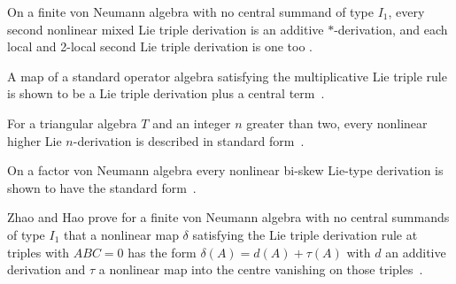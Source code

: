 On a finite von Neumann algebra with no central summand of type $I_1$, every second nonlinear mixed Lie triple derivation is an additive $*$-derivation, and each local and 2-local second Lie triple derivation is one too \cite[Abstract]{SecondNonlinearMixedLieTriple2020}.

A map of a standard operator algebra satisfying the multiplicative Lie triple rule is shown to be a Lie triple derivation plus a central term~\cite{WlMultiplicativeLieTriple2018}.

For a triangular algebra $T$ and an integer $n$ greater than two, every nonlinear higher Lie $n$-derivation is described in standard form~\cite{WlTriangularAlgebrasWithNonlinea2021}.

On a factor von Neumann algebra every nonlinear bi-skew Lie-type derivation is shown to have the standard form~\cite{WlNonlinearBiSkewLieTypeDerivati2020}.

Zhao and Hao prove for a finite von Neumann algebra with no central summands of type $I_1$ that a nonlinear map $\delta$ satisfying the Lie triple derivation rule at triples with $ABC=0$ has the form $\delta(A)=d(A)+\tau(A)$ with $d$ an additive derivation and $\tau$ a nonlinear map into the centre vanishing on those triples~\cite{WlNonGlobalNonlinearLieTripleDer2021}.

